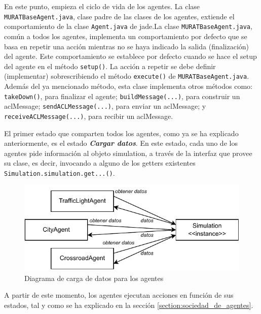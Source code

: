 En este punto, empieza el ciclo de vida de los agentes. La clase \newline\lstinline{MURATBaseAgent.java}, clase padre de las clases de los agentes, extiende el comportamiento de la clase \lstinline{Agent.java} de \acrshort{jade}.La clase \lstinline{MURATBaseAgent.java}, común a todos los agentes, implementa un comportamiento por defecto que se basa en repetir una acción mientras no se haya indicado la salida (finalización) del agente. Este comportamiento se establece por defecto cuando se hace el setup del agente en el método \lstinline{setup()}. La acción a repetir se debe definir (implementar) sobrescribiendo el método \lstinline{execute()} de \lstinline{MURATBaseAgent.java}. Además del ya mencionado método, esta clase implementa otros métodos como: \lstinline{takeDown()}, para finalizar el agente; \lstinline{buildMessage(...)}, para construir un \acrshort{acl}Message; \lstinline{sendACLMessage(...)}, para enviar un \acrshort{acl}Message; y \lstinline{receiveACLMessage(...)}, para recibir un \acrshort{acl}Message.

El primer estado que comparten todos los agentes, como ya se ha explicado anteriormente, es el estado \textbf{\textit{Cargar datos}}. En este estado, cada uno de los agentes pide información al objeto {simulation}, a través de la interfaz que provee su clase, es decir, invocando a alguno de los getters existentes \lstinline{Simulation.simulation.get...()}.
\begin{figure}[H]
    \centering
    \includegraphics[width=1\linewidth]{text/image/D-Carga_de_datos S-As.pdf}
    \caption{Diagrama de carga de datos para los agentes}
    \label{fig:diagrama_carga_datos_agentes}
\end{figure}

A partir de este momento, los agentes ejecutan acciones en función de sus estados, tal y como se ha explicado en la sección \ref{section:sociedad_de_agentes}.

